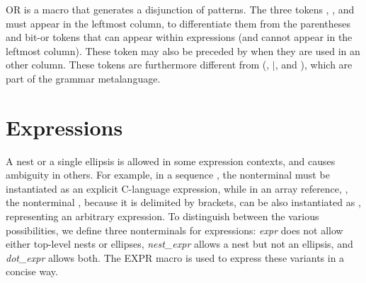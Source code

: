 \noindent
OR is a macro that generates a disjunction of patterns.  The three
tokens \T{(}, \T{\ttmid}, and \T{)} must appear in the leftmost
column, to differentiate them from the parentheses and bit-or tokens
that can appear within expressions (and cannot appear in the leftmost
column). These token may also be preceded by \texttt{\bs}
when they are used in an other column.  These tokens are furthermore
different from (, \(\mid\), and ), which are part of the grammar
metalanguage.

\section{Expressions}

A nest or a single ellipsis is allowed in some expression contexts, and
causes ambiguity in others.  For example, in a sequence , the nonterminal  must be instantiated as an
explicit C-language expression, while in an array reference,
, the
nonterminal , because it is delimited by brackets, can
be also instantiated as \mtt{\ldots}, representing an arbitrary expression.  To
distinguish between the various possibilities, we define three nonterminals
for expressions: {\em expr} does not allow either top-level nests or
ellipses, {\em nest\_expr} allows a nest but not an ellipsis, and {\em
dot\_expr} allows both.  The EXPR macro is used to express these variants
in a concise way.

